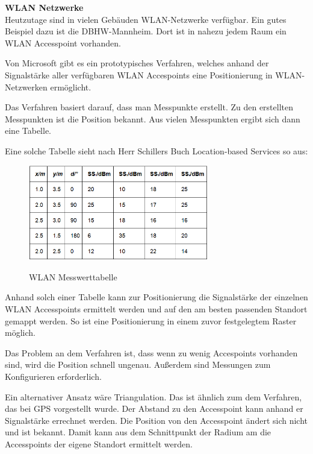 \textbf{WLAN Netzwerke}\\
Heutzutage sind in vielen Gebäuden WLAN-Netzwerke verfügbar. Ein gutes Beispiel dazu ist die DBHW-Mannheim. Dort ist in nahezu jedem Raum ein WLAN Accesspoint vorhanden.

Von Microsoft gibt es ein prototypisches Verfahren, welches anhand der Signalstärke aller verfügbaren WLAN Accespoints eine Positionierung in WLAN-Netzwerken ermöglicht. 

Das Verfahren basiert darauf, dass man Messpunkte erstellt. Zu den erstellten Messpunkten ist die Position bekannt. Aus vielen Messpunkten ergibt sich dann eine Tabelle.

\cite[S. 210]{Schiller2004}

Eine solche Tabelle sieht nach Herr Schillers Buch Location-based Services so aus:

\begin{figure}[h]
\centering
\includegraphics[width=0.7\textwidth]{ref/images/WLAN_Tabelle.PNG}
\caption[WLAN Messwerttabelle]{WLAN Messwerttabelle}
\cite[S. 210]{Schiller2004}
\end{figure}

Anhand solch einer Tabelle kann zur Positionierung die Signalstärke der einzelnen WLAN Accesspoints ermittelt werden und auf den am besten passenden Standort gemappt werden. So ist eine Positionierung in einem zuvor festgelegtem Raster möglich.

Das Problem an dem Verfahren ist, dass wenn zu wenig Accespoints vorhanden sind, wird die Position schnell ungenau. Außerdem sind Messungen zum Konfigurieren erforderlich. 

Ein alternativer Ansatz wäre Triangulation. Das ist ähnlich zum dem Verfahren, das bei GPS vorgestellt wurde. Der Abstand zu den Accesspoint kann anhand er Signalstärke errechnet werden. Die Position von den Accesspoint ändert sich nicht und ist bekannt. Damit kann aus dem Schnittpunkt der Radium am die Accesspoints der eigene Standort ermittelt werden.

